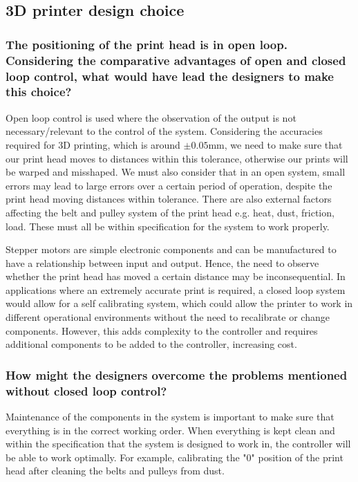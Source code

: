 \documentclass[class=report, crop=false, 12pt,a4paper]{standalone}
\begin{document}
\subsection*{3D printer design choice}
\subsubsection*{The positioning of the print head is in open loop. Considering the comparative advantages of open and closed loop control, what would have lead the designers to make this choice?}
Open loop control is used where the observation of the output is not necessary/relevant to the control of the system. Considering the accuracies required for 3D printing, which is around $\pm 0.05 \si{\milli\m}$, we need to make sure that our print head moves to distances within this tolerance, otherwise our prints will be warped and misshaped. We must also consider that in an open system, small errors may lead to large errors over a certain period of operation, despite the print head moving distances within tolerance. There are also external factors affecting the belt and pulley system of the print head e.g. heat, dust, friction, load. These must all be within specification for the system to work properly.

Stepper motors are simple electronic components and can be manufactured to have a relationship between input and output. Hence, the need to observe whether the print head has moved a certain distance may be inconsequential. In applications where an extremely accurate print is required, a closed loop system would allow for a self calibrating system, which could allow the printer to work in different operational environments without the need to recalibrate or change components. However, this adds complexity to the controller and requires additional components to be added to the controller, increasing cost. 
\subsubsection*{How might the designers overcome the problems mentioned without closed loop control?}
Maintenance of the components in the system is important to make sure that everything is in the correct working order. When everything is kept clean and within the specification that the system is designed to work in, the controller will be able to work optimally. For example, calibrating the "0" position of the print head after cleaning the belts and pulleys from dust. 
\end{document}
